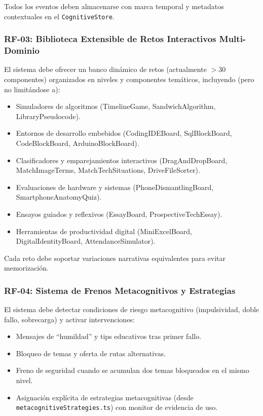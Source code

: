 \documentclass[11pt,a4paper]{article}
\begin{document}
Todos los eventos deben almacenarse con marca temporal y metadatos contextuales en el \texttt{CognitiveStore}.

\subsubsection{RF-03: Biblioteca Extensible de Retos Interactivos Multi-Dominio}

El sistema debe ofrecer un banco dinámico de retos (actualmente $>30$ componentes) organizados en niveles y componentes temáticos, incluyendo (pero no limitándose a):

\begin{itemize}
    \item Simuladores de algoritmos (TimelineGame, SandwichAlgorithm, LibraryPseudocode).
    \item Entornos de desarrollo embebidos (CodingIDEBoard, SqlBlockBoard, CodeBlockBoard, ArduinoBlockBoard).
    \item Clasificadores y emparejamientos interactivos (DragAndDropBoard, MatchImageTerms, MatchTechSituations, DriveFileSorter).
    \item Evaluaciones de hardware y sistemas (PhoneDismantlingBoard, SmartphoneAnatomyQuiz).
    \item Ensayos guiados y reflexivos (EssayBoard, ProspectiveTechEssay).
    \item Herramientas de productividad digital (MiniExcelBoard, DigitalIdentityBoard, AttendanceSimulator).
\end{itemize}

Cada reto debe soportar variaciones narrativas equivalentes para evitar memorización.

\subsubsection{RF-04: Sistema de Frenos Metacognitivos y Estrategias}

El sistema debe detectar condiciones de riesgo metacognitivo (impulsividad, doble fallo, sobrecarga) y activar intervenciones:

\begin{itemize}
    \item Mensajes de ``humildad'' y tips educativos tras primer fallo.
    \item Bloqueo de temas y oferta de rutas alternativas.
    \item Freno de seguridad cuando se acumulan dos temas bloqueados en el mismo nivel.
    \item Asignación explícita de estrategias metacognitivas (desde \texttt{metacognitiveStrategies.ts}) con monitor de evidencia de uso.
\end{itemize}
\end{document}
